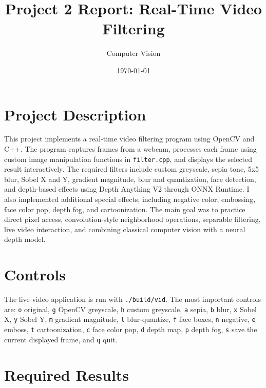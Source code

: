 \documentclass[11pt]{article}
\title{Project 2 Report: Real-Time Video Filtering}
\author{Computer Vision}
\date{\today}
\begin{document}
\maketitle

\section*{Project Description}
This project implements a real-time video filtering program using OpenCV and C++. The program captures frames from a webcam, processes each frame using custom image manipulation functions in \texttt{filter.cpp}, and displays the selected result interactively. The required filters include custom greyscale, sepia tone, 5x5 blur, Sobel X and Y, gradient magnitude, blur and quantization, face detection, and depth-based effects using Depth Anything V2 through ONNX Runtime. I also implemented additional special effects, including negative color, embossing, face color pop, depth fog, and cartoonization. The main goal was to practice direct pixel access, convolution-style neighborhood operations, separable filtering, live video interaction, and combining classical computer vision with a neural depth model.

\section*{Controls}
The live video application is run with \texttt{./build/vid}. The most important controls are: \texttt{o} original, \texttt{g} OpenCV greyscale, \texttt{h} custom greyscale, \texttt{a} sepia, \texttt{b} blur, \texttt{x} Sobel X, \texttt{y} Sobel Y, \texttt{m} gradient magnitude, \texttt{l} blur-quantize, \texttt{f} face boxes, \texttt{n} negative, \texttt{e} emboss, \texttt{t} cartoonization, \texttt{c} face color pop, \texttt{d} depth map, \texttt{p} depth fog, \texttt{s} save the current displayed frame, and \texttt{q} quit.

\section*{Required Results}
\end{document}
